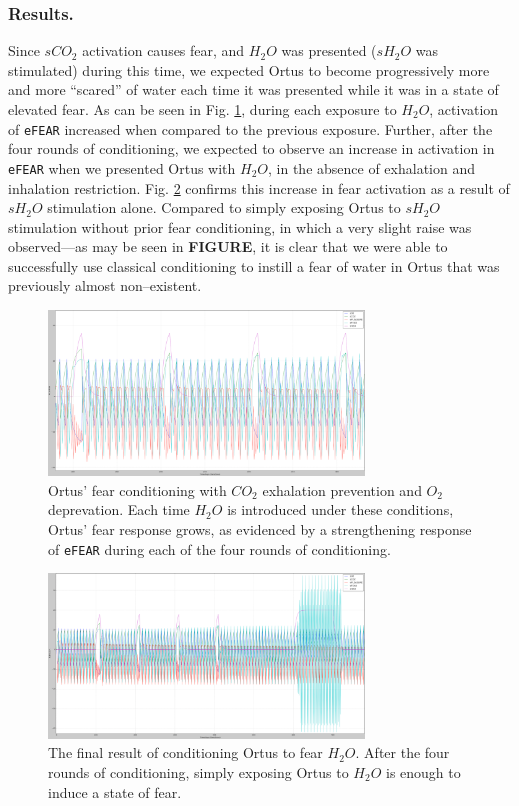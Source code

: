 \documentclass[letterpaper]{article}
\begin{document}
\subsubsection{Results.} Since $sCO_2$ activation causes fear, and $H_2O$ was presented ($sH_2O$ was stimulated) during this time, we expected Ortus to become progressively more and more ``scared'' of water each time it was presented while it was in a state of elevated fear.
As can be seen in Fig. \ref{conditioning}, during each exposure to $H_2O$, activation of \texttt{eFEAR} increased when compared to the previous exposure.
Further, after the four rounds of conditioning, we expected to observe an increase in activation in \texttt{eFEAR} when we presented Ortus with $H_2O$, in the absence of exhalation and inhalation restriction. Fig. \ref{conditioned} confirms this increase in fear activation as a result of $sH_2O$ stimulation alone. Compared to simply exposing Ortus to $sH_2O$ stimulation without prior fear conditioning, in which a very slight raise was observed---as may be seen in \textbf{FIGURE}, it is clear that we were able to successfully use classical conditioning to instill a fear of water in Ortus that was previously almost non--existent. 

\begin{figure}
\begin{center}
\includegraphics[width=3.3in]{images/conditioning_small.png}
\caption{Ortus' fear conditioning with $CO_2$ exhalation prevention and $O_2$ deprevation. Each time $H_2O$ is introduced under these conditions, Ortus' fear response grows, as evidenced by a strengthening response of \texttt{eFEAR} during each of the four rounds of conditioning.}
\label{conditioning}
\end{center}
\end{figure}

\begin{figure}
\begin{center}
\includegraphics[width=3.3in]{images/conditioned_small.png}
\caption{The final result of conditioning Ortus to fear $H_2O$. After the four rounds of conditioning, simply exposing Ortus to $H_2O$ is enough to induce a state of fear.}
\label{conditioned}
\end{center}
\end{figure}
\end{document}
